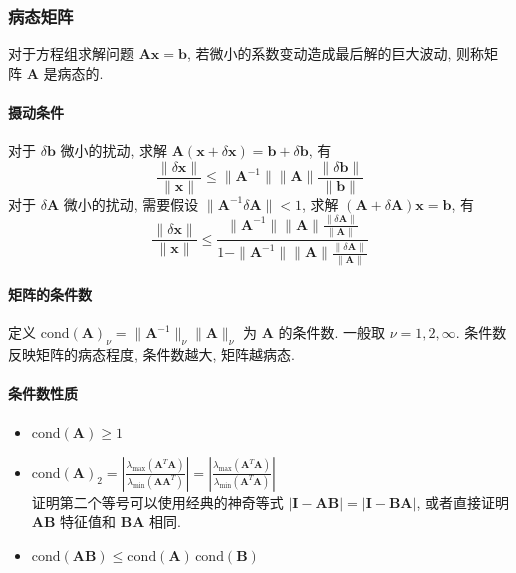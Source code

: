 \documentclass{ctexart}
\newcommand{\cond}{\mathrm{cond}}
\begin{document}
\subsubsection{病态矩阵}
    对于方程组求解问题 $\mathbf{A} \mathbf{x} = \mathbf{b}$, 若微小的系数变动造成最后解的巨大波动,
    则称矩阵 $\mathbf{A}$ 是病态的.
\paragraph{摄动条件}
    对于 $\delta \mathbf{b}$ 微小的扰动,
    求解 $\mathbf{A} (\mathbf{x} + \delta \mathbf{x}) = \mathbf{b} + \delta \mathbf{b}$, 有 \[
        \frac{\|\delta \mathbf{x}\|}{\|\mathbf{x}\|} \le %
        \|\mathbf{A}^{-1}\| \|\mathbf{A}\| \frac{\|\delta \mathbf{b}\|}{\|\mathbf{b}\|}\]
    对于 $\delta \mathbf{A}$ 微小的扰动, 需要假设 $\| \mathbf{A}^{-1} \delta \mathbf{A} \| < 1$,
    求解 $(\mathbf{A} + \delta \mathbf{A}) \mathbf{x} = \mathbf{b}$, 有 \[
        \frac{\|\delta \mathbf{x}\|}{\|\mathbf{x}\|} \le %
        \frac{\|\mathbf{A} ^{-1}\| \|\mathbf{A} \| \frac{\|\delta \mathbf{A} \|}{\|\mathbf{A} \|}}%
        { 1 -  \|\mathbf{A} ^{-1}\| \|\mathbf{A} \| \frac{\|\delta \mathbf{A} \|}{\|\mathbf{A} \|}}\]
\paragraph{矩阵的条件数}
    定义 $\cond(\mathbf{A} )_{\nu} = \|\mathbf{A} ^{-1}\|_{\nu} \|\mathbf{A}\|_{\nu}$ 为 $\mathbf{A}$ 的条件数.
    一般取 $\nu = 1, 2, \infty$.
    条件数反映矩阵的病态程度, 条件数越大, 矩阵越病态.\par
\paragraph{条件数性质}
    \begin{itemize}
        \item $\cond(\mathbf{A} ) \ge 1$
        \item $\cond(\mathbf{A} )_2 = \left| \frac{\lambda_{\max}(\mathbf{A}^T \mathbf{A})}{\lambda_{\min}(\mathbf{A} \mathbf{A}^T)}\right|
                = \left| \frac{\lambda_{\max}(\mathbf{A}^T \mathbf{A})}{\lambda_{\min}(\mathbf{A}^T \mathbf{A})} \right|$\\
                证明第二个等号可以使用经典的神奇等式 $| \mathbf{I} - \mathbf{A} \mathbf{B} | = | \mathbf{I} - \mathbf{B} \mathbf{A} |$,
                或者直接证明 $\mathbf{A} \mathbf{B}$ 特征值和 $\mathbf{B} \mathbf{A}$ 相同.
        \item $\cond(\mathbf{A} \mathbf{B}) \le \cond(\mathbf{A} )\, \cond(\mathbf{B})$
    \end{itemize}
\end{document}

